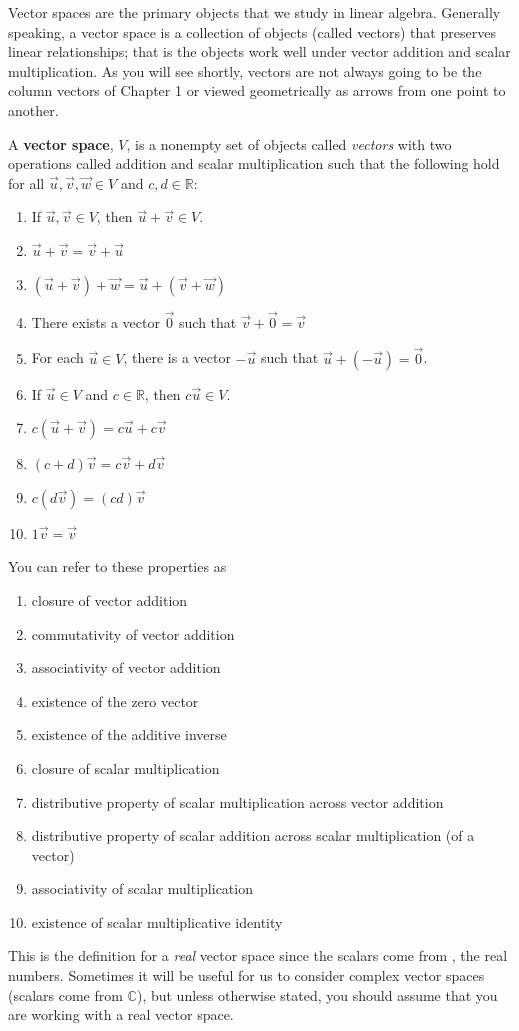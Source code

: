 Vector spaces are the primary objects that we study in linear algebra. Generally speaking, a vector space is a collection of objects (called vectors) that preserves linear relationships; that is the objects work well under vector addition and scalar multiplication. As you will see shortly, vectors are not always going to be the column vectors of Chapter 1 or viewed geometrically as arrows from one point to another.
\begin{definition}
A \textbf{vector space}, $V$, is a nonempty set of objects called \emph{vectors} with two operations called addition and scalar multiplication such that the following hold for all $\vec{u}, \vec{v}, \vec{w} \in V$ and $c,d \in \mathbb{R}$:
\begin{enumerate}
\item If $\vec{u}, \vec{v} \in V$, then $\vec{u}+\vec{v}\in V$.
\item $\vec{u}+\vec{v}=\vec{v}+\vec{u}$
\item $(\vec{u}+\vec{v})+\vec{w}=\vec{u}+(\vec{v}+\vec{w})$
\item There exists a vector $\vec{0}$ such that $\vec{v}+\vec{0}=\vec{v}$
\item For each $\vec{u} \in V$, there is a vector $-\vec{u}$ such that $\vec{u} + (-\vec{u})=\vec{0}$.
\item If $\vec{u} \in V$ and $c \in \mathbb{R}$, then $c\vec{u} \in V$.
\item $c(\vec{u}+\vec{v})=c\vec{u}+c\vec{v}$
\item $(c+d)\vec{v}=c\vec{v}+d\vec{v}$
\item $c(d\vec{v})=(cd)\vec{v}$
\item $1 \vec{v}=\vec{v}$
\end{enumerate}
You can refer to these properties as
\begin{enumerate}
\item closure of vector addition
\item commutativity of vector addition
\item associativity of vector addition
\item existence of the zero vector
\item existence of the additive inverse
\item closure of scalar multiplication
\item distributive property of scalar multiplication across vector addition
\item distributive property of scalar addition across scalar multiplication (of a vector)
\item associativity of scalar multiplication
\item existence of scalar multiplicative identity
\end{enumerate}
\end{definition}
This is the definition for a \emph{real} vector space since the scalars come from \R, the real numbers. Sometimes it will be useful for us to consider complex vector spaces (scalars come from $\mathbb{C}$), but unless otherwise stated, you should assume that you are working with a real vector space.

